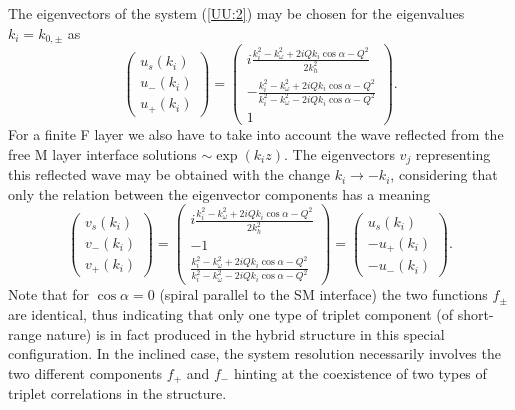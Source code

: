 \documentclass[prb,amsmath,amssymb,reprint]{revtex4-2}
\begin{document}
The eigenvectors of the system (\ref{UU:2}) may be chosen for the eigenvalues $%
k_i=k_{0,\pm }$ as
\begin{equation}
\left(
\begin{array}{c}
u_{s}(k_i) \\
u_{-}(k_i) \\
u_{+}(k_i)
\end{array}
\right) =\left(
\begin{array}{c}
i\frac{k_i^{2}-k_{\omega }^{2}+2iQk_i\cos \alpha -Q^{2}}{2k_{h}^{2}} \\
-\frac{k_i^{2}-k_{\omega }^{2}+2iQk_i\cos \alpha -Q^{2}}{k_i^{2}-k_{\omega
}^{2}-2iQk_i\cos \alpha -Q^{2}} \\
1
\end{array}
\right). \label{Eigenvec:u}
\end{equation}
For a finite F layer we also have to take into account the wave reflected
from the free M layer interface solutions $\sim\exp (k_{i}z)$. The
eigenvectors $v_{j}$ representing this reflected wave may be obtained with the change $k_{i}\rightarrow -k_{i}$, considering that only the relation between the eigenvector components has a meaning
\begin{equation}
\left(
\begin{array}{c}
v_{s}(k_i) \\
v_{-}(k_i) \\
v_{+}(k_i)
\end{array}
\right) =\left(
\begin{array}{c}
i\frac{k_i^{2}-k_{\omega }^{2}+2iQk_i\cos \alpha -Q^{2}}{2k_{h}^{2}} \\
-1 \\
\frac{k_i^{2}-k_{\omega }^{2}+2iQk_i\cos \alpha -Q^{2}}{k_i^{2}-k_{\omega
}^{2}-2iQk_i\cos \alpha -Q^{2}}
\end{array}
\right) =\left(
\begin{array}{c}
u_{s}(k_i) \\
-u_{+}(k_i) \\
-u_{-}(k_i)
\end{array}
\right).   \label{Eigenvec:v}
\end{equation}
 Note that for $\cos \alpha =0$ (spiral parallel to the SM interface) the two functions $f_{\pm}$ are identical, thus indicating that only one type of triplet component (of short-range nature) is in fact produced \cite{Champel2005} in the hybrid structure in this special configuration.
In the inclined case, the system resolution necessarily involves the two different components $f_{+}$ and $f_{-}$ hinting at the coexistence of two types of triplet correlations in the structure.
\end{document}
